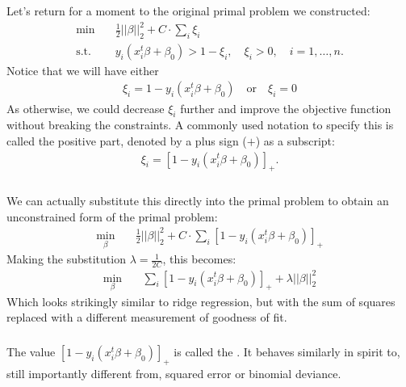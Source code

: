 \documentclass[xetex,mathserif,serif,aspectratio=169]{beamer}
\begin{document}
\begin{frame}[fragile] \frametitle{} \oldB \small

\textbf{}

Let's return for a moment to the original primal problem we
constructed:
\begin{align*}
\min \quad &  \frac{1}{2} || \beta ||_2^2 + C \cdot \sum_i \xi_i \\
\text{s.t.} \quad & y_i (x_i^t \beta + \beta_0) > 1 - \xi_i, \quad \xi_i > 0, \quad i = 1, \ldots, n.
\end{align*}
Notice that we will have either
\begin{align*}
\xi_i = 1 - y_i (x_i^t \beta + \beta_0) \quad \text{or} \quad \xi_i = 0
\end{align*}
As otherwise, we could decrease $\xi_i$ further and improve the objective
function without breaking the constraints. A commonly used notation to
specify this is called the positive part, denoted by a plus sign ($+$)
as a subscript:
\begin{align*}
\xi_i = \left[ 1 - y_i (x_i^t \beta + \beta_0) \right]_{+}.
\end{align*}

\end{frame}

\begin{frame}[fragile] \frametitle{} \oldB \small

\textbf{}

We can actually substitute this directly into the primal problem to
obtain an unconstrained form of the primal problem:
\begin{align*}
\min_\beta \quad &  \frac{1}{2} || \beta ||_2^2 + C \cdot \sum_i \left[ 1 - y_i (x_i^t \beta + \beta_0) \right]_{+}
\end{align*}
Making the substitution $\lambda = \frac{1}{2C}$, this becomes:
\begin{align*}
\min_\beta \quad & \sum_i \left[ 1 - y_i (x_i^t \beta + \beta_0) \right]_{+} + \lambda || \beta ||_2^2
\end{align*}
Which looks strikingly similar to ridge regression, but with the sum of
squares replaced with a different measurement of goodness of fit.

\end{frame}

\begin{frame}[fragile] \frametitle{} \oldB \small

\textbf{}

The value $\left[ 1 - y_i (x_i^t \beta + \beta_0) \right]_{+}$ is called
the . It behaves similarly in spirit to, still importantly
different from, squared error or binomial deviance.

\end{frame}
\end{document}
